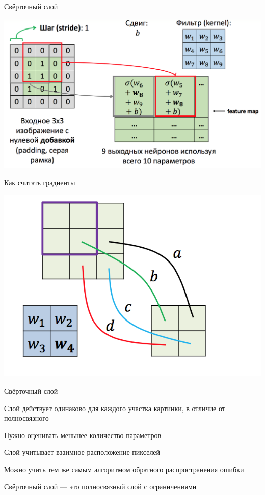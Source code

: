 \documentclass[notes,12pt, aspectratio=169]{beamer}
\newenvironment{wideitemize}{\itemize\addtolength{\itemsep}{10pt}}{\enditemize}
\begin{document}
\begin{frame}{Свёрточный слой}
\begin{center}
	\includegraphics[width=.8\linewidth]{conv_layer_2.png}
\end{center}
\end{frame}


\begin{frame}{Как считать градиенты}
\begin{center}
 \includegraphics[width=.4\linewidth]{back_cl1.png}
\end{center}



\end{frame}


\begin{frame}{Свёрточный слой}
\begin{wideitemize}
	\item  Слой действует одинаково для каждого участка картинки, в отличие от полносвязного 
	\item  Нужно оценивать меньшее количество параметров
	\item  Слой учитывает взаимное расположение пикселей
	\item  Можно учить тем же самым алгоритмом обратного распространения ошибки
	\item  Свёрточный слой —  это полносвязный слой с ограничениями
\end{wideitemize}
\end{frame}
\end{document}

